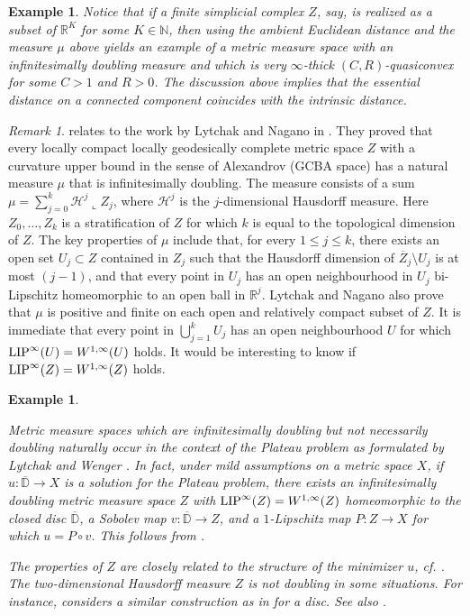 \documentclass[reqno]{amsart}
\newcommand{\LIP}{{\rm LIP}}
\numberwithin{equation}{section}
\newtheorem{example}[theorem]{Example}
\theoremstyle{remark}
\newtheorem{remark}[theorem]{Remark}
\begin{document}
\begin{example}
{Notice that if a finite simplicial complex $Z$, say, is realized as a subset of $\mathbb{R}^K$ for some $K \in \mathbb{N}$, then using the ambient Euclidean distance and the measure $\mu$ above yields an example of a metric measure space with an infinitesimally doubling measure and which is very $\infty$-thick $(C,R)$-quasiconvex for some $C > 1$ and $R > 0$. The discussion above implies that the essential distance on a connected component coincides with the intrinsic distance.}
\end{example}
%
%
\begin{remark}
 relates to the work by Lytchak and Nagano in \cite{Lyt:Nag}. They proved that every locally compact locally geodesically complete metric space $Z$ with a curvature upper bound in the sense of Alexandrov (GCBA space) has a natural measure $\mu$ that is infinitesimally doubling. The measure consists of a sum $\mu = \sum_{ j = 0 }^{ k } \mathcal{H}^{j}\llcorner{ Z_j }$, where $\mathcal{H}^j$ is the $j$-dimensional Hausdorff measure. Here $Z_0, \dots, Z_k$ is a stratification of $Z$ for which $k$ is equal to the topological dimension of $Z$. The key properties of $\mu$ include that, for every $1 \leq j \leq k$, there exists an open set $U_j \subset Z$ contained in $Z_j$ such that the Hausdorff dimension of $\overline{Z}_j \setminus U_j$ is at most $(j-1)$, and that every point in $U_j$ has an open neighbourhood in $U_j$ bi-Lipschitz homeomorphic to an open ball in $\mathbb{R}^j$. Lytchak and Nagano also prove that $\mu$ is positive and finite on each open and relatively compact subset of $Z$. It is immediate that every point in $\bigcup_{j = 1 }^{ k } U_j$ has an open neighbourhood $U$ for which $\LIP^{\infty}(U) = W^{1,\infty}(U)$ holds. It would be interesting to know if $\LIP^{\infty}(Z) = W^{1,\infty}(Z)$ holds.
\end{remark}
%
%
\begin{example}\label{ex:Lyt-Wen}
{\em Metric measure spaces which are infinitesimally doubling but not necessarily doubling naturally occur in the context of the Plateau problem as formulated by Lytchak and Wenger \cite{Lyt:Wen:17:areamini,Lyt:Wen:17:energyarea,Lyt:Wen:18:intrinsic,Lyt:Wen:18:CAT}. In fact, under mild assumptions on a metric space $X$, if $u \colon \overline{\mathbb{D}} \rightarrow X$ is a solution for the Plateau problem, there exists an infinitesimally doubling metric measure space $Z$ with $\LIP^{\infty}(Z) = W^{1,\infty}(Z)$ homeomorphic to the closed disc $\overline{\mathbb{D}}$, a Sobolev map $v \colon \overline{\mathbb{D}} \to Z$, and a $1$-Lipschitz map $P \colon Z \to X$ for which $u = P \circ v$. This follows from \cite[Theorem 1.9]{Creutz_Soultanis}. 

The properties of $Z$ are closely related to the structure of the minimizer $u$, cf. \cite{Lyt:Wen:18:intrinsic,Lyt:Wen:18:CAT}. The two-dimensional Hausdorff measure $Z$ is not doubling in some situations. For instance, \cite[Example 11.3]{Lyt:Wen:18:CAT} considers a similar construction as in  for a disc. See also \cite[Example 6.4]{Creutz_Soultanis}.}
\end{example}
\end{document}
